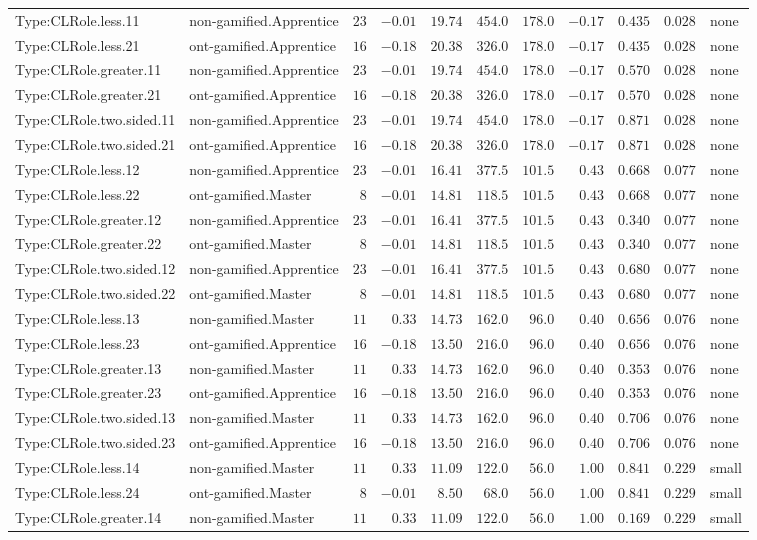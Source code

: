 \documentclass[6pt,a4paper]{article}
\begin{document}
{\begin{longtable}{llrrrrrrrrl}
Type:CLRole.less.11&non-gamified.Apprentice&$23$&$-0.01$&$19.74$&$ 454.0$&$178.0$&$-0.17$&$0.435$&$0.028$&none\tabularnewline
Type:CLRole.less.21&ont-gamified.Apprentice&$16$&$-0.18$&$20.38$&$ 326.0$&$178.0$&$-0.17$&$0.435$&$0.028$&none\tabularnewline
Type:CLRole.greater.11&non-gamified.Apprentice&$23$&$-0.01$&$19.74$&$ 454.0$&$178.0$&$-0.17$&$0.570$&$0.028$&none\tabularnewline
Type:CLRole.greater.21&ont-gamified.Apprentice&$16$&$-0.18$&$20.38$&$ 326.0$&$178.0$&$-0.17$&$0.570$&$0.028$&none\tabularnewline
Type:CLRole.two.sided.11&non-gamified.Apprentice&$23$&$-0.01$&$19.74$&$ 454.0$&$178.0$&$-0.17$&$0.871$&$0.028$&none\tabularnewline
Type:CLRole.two.sided.21&ont-gamified.Apprentice&$16$&$-0.18$&$20.38$&$ 326.0$&$178.0$&$-0.17$&$0.871$&$0.028$&none\tabularnewline
Type:CLRole.less.12&non-gamified.Apprentice&$23$&$-0.01$&$16.41$&$ 377.5$&$101.5$&$ 0.43$&$0.668$&$0.077$&none\tabularnewline
Type:CLRole.less.22&ont-gamified.Master&$ 8$&$-0.01$&$14.81$&$ 118.5$&$101.5$&$ 0.43$&$0.668$&$0.077$&none\tabularnewline
Type:CLRole.greater.12&non-gamified.Apprentice&$23$&$-0.01$&$16.41$&$ 377.5$&$101.5$&$ 0.43$&$0.340$&$0.077$&none\tabularnewline
Type:CLRole.greater.22&ont-gamified.Master&$ 8$&$-0.01$&$14.81$&$ 118.5$&$101.5$&$ 0.43$&$0.340$&$0.077$&none\tabularnewline
Type:CLRole.two.sided.12&non-gamified.Apprentice&$23$&$-0.01$&$16.41$&$ 377.5$&$101.5$&$ 0.43$&$0.680$&$0.077$&none\tabularnewline
Type:CLRole.two.sided.22&ont-gamified.Master&$ 8$&$-0.01$&$14.81$&$ 118.5$&$101.5$&$ 0.43$&$0.680$&$0.077$&none\tabularnewline
Type:CLRole.less.13&non-gamified.Master&$11$&$ 0.33$&$14.73$&$ 162.0$&$ 96.0$&$ 0.40$&$0.656$&$0.076$&none\tabularnewline
Type:CLRole.less.23&ont-gamified.Apprentice&$16$&$-0.18$&$13.50$&$ 216.0$&$ 96.0$&$ 0.40$&$0.656$&$0.076$&none\tabularnewline
Type:CLRole.greater.13&non-gamified.Master&$11$&$ 0.33$&$14.73$&$ 162.0$&$ 96.0$&$ 0.40$&$0.353$&$0.076$&none\tabularnewline
Type:CLRole.greater.23&ont-gamified.Apprentice&$16$&$-0.18$&$13.50$&$ 216.0$&$ 96.0$&$ 0.40$&$0.353$&$0.076$&none\tabularnewline
Type:CLRole.two.sided.13&non-gamified.Master&$11$&$ 0.33$&$14.73$&$ 162.0$&$ 96.0$&$ 0.40$&$0.706$&$0.076$&none\tabularnewline
Type:CLRole.two.sided.23&ont-gamified.Apprentice&$16$&$-0.18$&$13.50$&$ 216.0$&$ 96.0$&$ 0.40$&$0.706$&$0.076$&none\tabularnewline
Type:CLRole.less.14&non-gamified.Master&$11$&$ 0.33$&$11.09$&$ 122.0$&$ 56.0$&$ 1.00$&$0.841$&$0.229$&small\tabularnewline
Type:CLRole.less.24&ont-gamified.Master&$ 8$&$-0.01$&$ 8.50$&$  68.0$&$ 56.0$&$ 1.00$&$0.841$&$0.229$&small\tabularnewline
Type:CLRole.greater.14&non-gamified.Master&$11$&$ 0.33$&$11.09$&$ 122.0$&$ 56.0$&$ 1.00$&$0.169$&$0.229$&small\tabularnewline

\end{longtable}}
\end{document}
